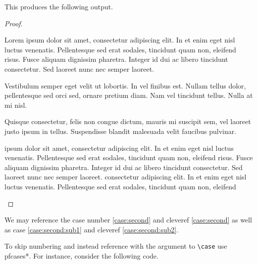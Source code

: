 \documentclass[leqno,11pt]{amsart}
\begin{document}
  This produces the following output.

\begin{proof}
\begin{pfcases}
\case[\( x = y \)]\label{case:first} %
	Lorem ipsum dolor sit amet, consectetur adipiscing elit. In et enim eget nisl luctus venenatis. Pellentesque sed erat sodales, tincidunt quam non, eleifend risus. Fusce aliquam dignissim pharetra. Integer id dui ac libero tincidunt consectetur. Sed laoreet nunc nec semper laoreet. 

	Vestibulum semper eget velit ut lobortis. In vel finibus est. Nullam tellus dolor, pellentesque sed orci sed, ornare pretium diam. Nam vel tincidunt tellus. Nulla at mi nisl. 

\case[\( x = z \land z > q \land z < r \land x + z = r \)] \label{case:second} %
	Quisque consectetur, felis non congue dictum, mauris mi suscipit sem, vel laoreet justo ipsum in tellus. Suspendisse blandit malesuada velit faucibus pulvinar. 

\begin{pfcases}
\case[\( x=2 \)] \label{case:second:sub1} %
	ipsum dolor sit amet, consectetur adipiscing elit. In et enim eget nisl luctus venenatis. Pellentesque sed erat sodales, tincidunt quam non, eleifend risus. Fusce aliquam dignissim pharetra. Integer id dui ac libero tincidunt consectetur. Sed laoreet nunc nec semper laoreet. 
\case[\( x = 3 \)] \label{case:second:sub2} %
	consectetur adipiscing elit. In et enim eget nisl luctus venenatis. Pellentesque sed erat sodales, tincidunt quam non, eleifend 
\end{pfcases}

\end{pfcases}
\end{proof}
We may reference the case number \ref{case:second} and cleveref \cref{case:second} as well as case \ref{case:second:sub1} and cleveref \cref{case:second:sub2}.



To skip numbering and instead reference with the argument to \verb=\case= use pfcases*.  For instance, consider the following code.
\end{document}
